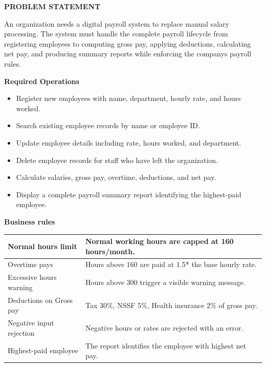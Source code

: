 \documentclass[
]{article}
\newcounter{none} %
\begin{document}
\textbf{PROBLEM STATEMENT}

An organization needs a digital payroll system to replace manual salary
processing. The system must handle the complete payroll lifecycle from
registering employees to computing gross pay, applying deductions,
calculating net pay, and producing summary reports while enforcing the
company\textquotesingle s payroll rules.

\textbf{Required Operations}

\begin{itemize}
\item
  Register new employees with name, department, hourly rate, and hours
  worked.
\item
  Search existing employee records by name or employee ID.
\item
  Update employee details including rate, hours worked, and department.
\item
  Delete employee records for staff who have left the organization.
\item
  Calculate salaries, gross pay, overtime, deductions, and net pay.
\item
  Display a complete payroll summary report identifying the highest-paid
  employee.
\end{itemize}

\textbf{Business rules}

{\def\LTcaptype{none} %
\begin{longtable}[]{@{}
  >{\raggedright\arraybackslash}p{}
  >{\raggedright\arraybackslash}p{}@{}}
\toprule\noalign{}
\begin{minipage}[b]{\linewidth}\raggedright
Normal hours limit
\end{minipage} & \begin{minipage}[b]{\linewidth}\raggedright
Normal working hours are capped at 160 hours/month.
\end{minipage} \\
\midrule\noalign{}
\endhead
\bottomrule\noalign{}
\endlastfoot
Overtime pays & Hours above 160 are paid at 1.5* the base hourly
rate. \\
Excessive hours warning & Hours above 300 trigger a visible warning
message. \\
Deductions on Gross pay & Tax 30\%, NSSF 5\%, Health insurance 2\% of
gross pay. \\
Negative input rejection & Negative hours or rates are rejected with an
error. \\
Highest-paid employee & The report identifies the employee with highest
net pay. \\
\end{longtable}
}
\end{document}
